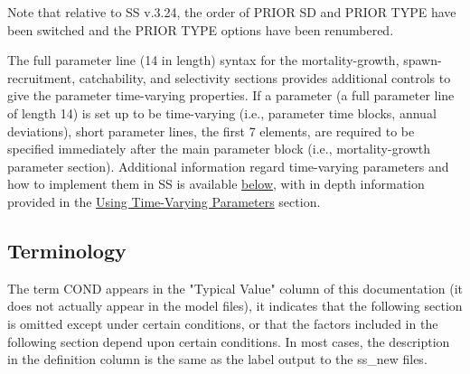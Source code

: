 Note that relative to SS v.3.24,  the order of PRIOR SD and PRIOR TYPE have been switched and the PRIOR TYPE options have been renumbered.

The full parameter line (14 in length) syntax for the mortality-growth, spawn-recruitment, catchability, and selectivity sections provides additional controls to give the parameter time-varying properties.  If a parameter (a full parameter line of length 14) is set up to be time-varying (i.e., parameter time blocks, annual deviations), short parameter lines, the first 7 elements, are required to be specified immediately after the main parameter block (i.e., mortality-growth parameter section).  Additional information regard time-varying parameters and how to implement them in SS is available \hyperlink{tvOrder}{below}, with in depth information provided in the \hyperlink{TVpara}{Using Time-Varying Parameters} section.


\subsection{Terminology}
The term COND appears in the "Typical Value" column of this documentation (it does not actually appear in the model files), it indicates that the following section is omitted except under certain conditions, or that the factors included in the following section depend upon certain conditions. In most cases, the description in the definition column is the same as the label output to the ss\_new files.

